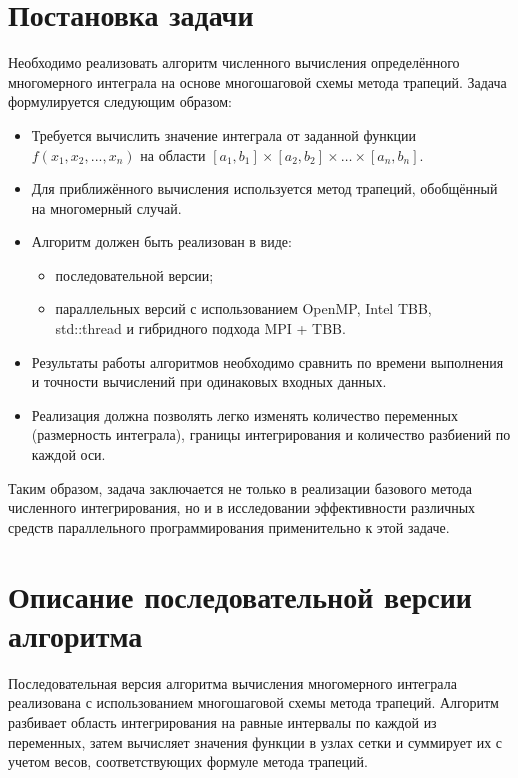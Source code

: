 \documentclass[a4paper,14pt]{article}
\begin{document}
\newpage
\section{Постановка задачи}

Необходимо реализовать алгоритм численного вычисления определённого многомерного интеграла на основе многошаговой схемы метода трапеций. Задача формулируется следующим образом:

\begin{itemize}
    \item Требуется вычислить значение интеграла от заданной функции\\ $f(x_1, x_2, ..., x_n)$ на области $[a_1, b_1] \times [a_2, b_2] \times \dots \times [a_n, b_n]$.
    \item Для приближённого вычисления используется метод трапеций, обобщённый на многомерный случай.
    \item Алгоритм должен быть реализован в виде:
    \begin{itemize}
        \item последовательной версии;
        \item параллельных версий с использованием OpenMP, Intel TBB,\\ std::thread и гибридного подхода MPI + TBB.
    \end{itemize}
    \item Результаты работы алгоритмов необходимо сравнить по времени выполнения и точности вычислений при одинаковых входных данных.
    \item Реализация должна позволять легко изменять количество переменных (размерность интеграла), границы интегрирования и количество разбиений по каждой оси.
\end{itemize}

Таким образом, задача заключается не только в реализации базового метода численного интегрирования, но и в исследовании эффективности различных средств параллельного программирования применительно к этой задаче.

\newpage
\section{Описание последовательной версии алгоритма}

Последовательная версия алгоритма вычисления многомерного интеграла реализована с использованием многошаговой схемы метода трапеций. Алгоритм разбивает область интегрирования на равные интервалы по каждой из переменных, затем вычисляет значения функции в узлах сетки и суммирует их с учетом весов, соответствующих формуле метода трапеций.
\end{document}
